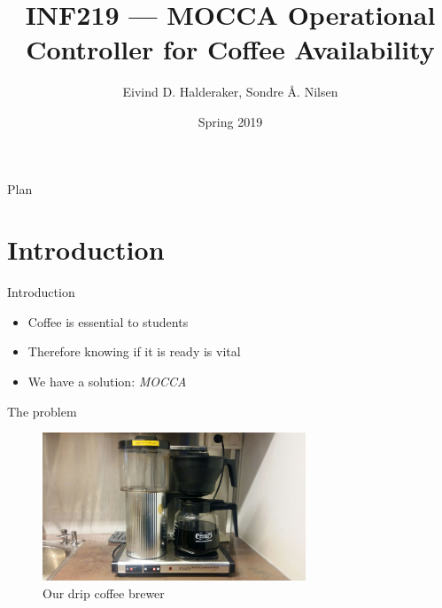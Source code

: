 \documentclass[presentation]{beamer}
\author{Eivind D. Halderaker, Sondre Å. Nilsen}
\date{Spring 2019}
\title{INF219 --- MOCCA Operational Controller for Coffee Availability}
\begin{document}
\maketitle
\begin{frame}{Plan}
\tableofcontents
\end{frame}


\section{Introduction}
\label{sec:org04b36c4}
\begin{frame}[label={sec:org2b19192}]{Introduction}
\begin{itemize}
\item Coffee is essential to students
\item Therefore knowing if it is ready is vital
\item We have a solution: \emph{MOCCA}
\end{itemize}
\end{frame}
\begin{frame}[label={sec:org1cd23e1}]{The problem}
\begin{figure}[htbp]
\centering
\includegraphics[width=0.7\textwidth]{./figures/brewer.jpeg}
\caption{\label{fix:brewer}
Our drip coffee brewer}
\end{figure}
\end{frame}
\end{document}
